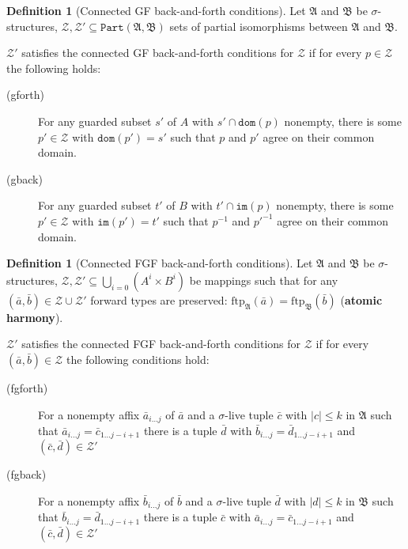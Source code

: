 \documentclass{scrartcl}
\theoremstyle{definition}
\newtheorem{definition}[theorem]{Definition}
\begin{document}
\begin{definition}[Connected GF back-and-forth conditions]
Let $\mathfrak{A}$ and $\mathfrak{B}$ be $\sigma$-structures, $\mathcal{Z}, \mathcal{Z'} \subseteq \mathtt{Part}(\mathfrak{A}, \mathfrak{B})$ sets of partial isomorphisms between $\mathfrak{A}$ and $\mathfrak{B}$.

$\mathcal{Z'}$ satisfies the connected GF back-and-forth conditions for $\mathcal{Z}$ if for every $p \in \mathcal{Z}$ the following holds:

\begin{description}
    \item[(gforth)] For any guarded subset $s'$ of $A$ with $s' \cap \mathtt{dom}(p)$ nonempty, there is some $p' \in \mathcal{Z}$ with $\mathtt{dom}(p') = s'$ such that $p$ and $p'$ agree on their common domain.
    \item[(gback)] For any guarded subset $t'$ of $B$ with $t' \cap \mathtt{im}(p)$ nonempty, there is some $p' \in \mathcal{Z}$ with $\mathtt{im}(p') = t'$ such that $p^{-1}$ and $p'^{-1}$ agree on their common domain.
\end{description}
\end{definition}

\begin{definition}[Connected FGF back-and-forth conditions]
Let $\mathfrak{A}$ and $\mathfrak{B}$ be $\sigma$-structures, $\mathcal{Z}, \mathcal{Z'} \subseteq \bigcup_{i=0}(A^i \times B^i)$ be mappings such that for any $(\bar{a}, \bar{b}) \in \mathcal{Z} \cup \mathcal{Z'}$ forward types are preserved: $\mathrm{ftp}_\mathfrak{A}(\bar{a}) = \mathrm{ftp}_\mathfrak{B}(\bar{b})$ (\textbf{atomic harmony}).

$\mathcal{Z'}$ satisfies the connected FGF back-and-forth conditions for $\mathcal{Z}$ if for every $(\bar{a}, \bar{b}) \in \mathcal{Z}$ the following conditions hold:

\begin{description}
    \item[(fgforth)] For a nonempty affix $\bar{a}_{i\ldots{}j}$ of $\bar{a}$ and a $\sigma$-live tuple $\bar{c}$ with $|c| \leq k$ in $\mathfrak{A}$ such that $\bar{a}_{i\ldots{}j} = \bar{c}_{1\ldots{}j-i+1}$ there is a tuple $\bar{d}$ with $\bar{b}_{i\ldots{}j} = \bar{d}_{1\ldots{}j-i+1}$ and $(\bar{c}, \bar{d}) \in \mathcal{Z'}$
    \item[(fgback)] For a nonempty affix $\bar{b}_{i\ldots{}j}$ of $\bar{b}$ and a $\sigma$-live tuple $\bar{d}$ with $|d| \leq k$ in $\mathfrak{B}$ such that $\bar{b}_{i\ldots{}j} = \bar{d}_{1\ldots{}j-i+1}$ there is a tuple $\bar{c}$ with $\bar{a}_{i\ldots{}j} = \bar{c}_{1\ldots{}j-i+1}$ and $(\bar{c}, \bar{d}) \in \mathcal{Z'}$
\end{description}
\end{definition}
\end{document}
